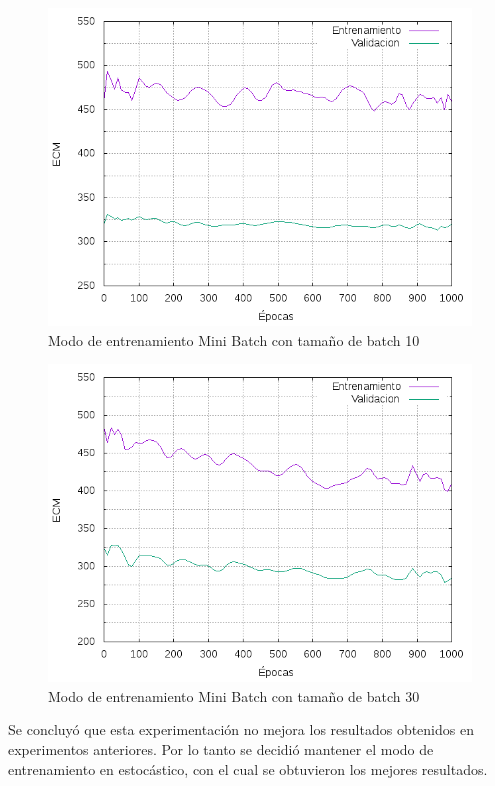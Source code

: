 \begin{figure}[H]
  \includegraphics[width=125mm]{imagenes/ej1/ex_4-2_red_11-6-6-9-1_errors.png}
  \caption{Modo de entrenamiento Mini Batch con tamaño de batch 10}
\end{figure}

\begin{figure}[H]
  \includegraphics[width=125mm]{imagenes/ej1/ex_4-3_red_11-6-6-9-1_errors.png}
  \caption{Modo de entrenamiento Mini Batch con tamaño de batch 30}
\end{figure}

Se concluyó que esta experimentación no mejora los resultados obtenidos en experimentos anteriores. Por lo tanto se decidió
mantener el modo de entrenamiento en estocástico, con el cual se obtuvieron los mejores resultados.

